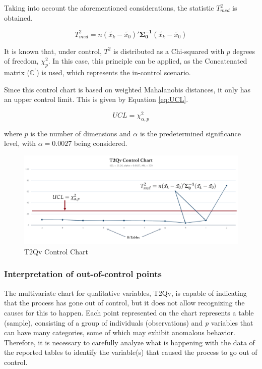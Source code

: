 \documentclass[mathematics,article,submit,moreauthors,pdftex]{mdpi}
\begin{document}
Taking into account the aforementioned considerations, the statistic
\(T^2_{med}\) is obtained.

\begin{equation}
T^2_{med}=n (\tilde{x_{k}}-\tilde{x_{0}})'\mathbf{\Sigma_{0}^{-1}}(\tilde{x_{k}}-\tilde{x_{0}})
\label{eq:T2med}
\end{equation}

It is known that, under control, \(T^2\) is distributed as a Chi-squared
with \(p\) degrees of freedom, \(\chi^2_p\). In this case, this
principle can be applied, as the Concatenated matrix
(\(\mathbb{C}^{'}\)) is used, which represents the in-control scenario.

Since this control chart is based on weighted Mahalanobis distances, it
only has an upper control limit. This is given by Equation \ref{eq:UCL}.

\begin{equation}
UCL=\chi^2_{\alpha,p}
\label{eq:UCL}
\end{equation}

where \(p\) is the number of dimensions and \(\alpha\) is the
predetermined significance level, with \(\alpha=0.0027\) being
considered.

\begin{figure}[!h]


\begin{center}\includegraphics[width=0.7\linewidth,]{t2qvesqi} \end{center}

\caption{T2Qv Control Chart}

\label{fig:t2qvesq}
\end{figure}

\hypertarget{interpretation-of-out-of-control-points}{%
\subsubsection{Interpretation of out-of-control
points}\label{interpretation-of-out-of-control-points}}

The multivariate chart for qualitative variables, T2Qv, is capable of
indicating that the process has gone out of control, but it does not
allow recognizing the causes for this to happen. Each point represented
on the chart represents a table (sample), consisting of a group of
individuals (observations) and \emph{p} variables that can have many
categories, some of which may exhibit anomalous behavior. Therefore, it
is necessary to carefully analyze what is happening with the data of the
reported tables to identify the variable(s) that caused the process to
go out of control.
\end{document}
